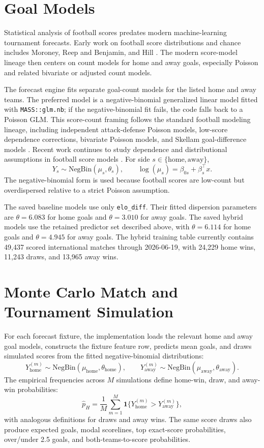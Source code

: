 \documentclass[11pt]{article}
\begin{document}
\section{Goal Models}

Statistical analysis of football scores predates modern machine-learning
tournament forecasts. Early work on football score distributions and chance
includes Moroney, Reep and Benjamin, and Hill
\cite{moroney1956,reepbenjamin1968,hill1974}. The modern score-model lineage
then centers on count models for home and away goals, especially Poisson and
related bivariate or adjusted count models.

The forecast engine fits separate goal-count models for the listed home and away
teams. The preferred model is a negative-binomial generalized linear model
fitted with \texttt{MASS::glm.nb}; if the negative-binomial fit fails, the code
falls back to a Poisson GLM. This score-count framing follows the standard
football modeling lineage, including independent attack-defense Poisson models,
low-score dependence corrections, bivariate Poisson models, and Skellam
goal-difference models
\cite{maher1982,lee1997,dixoncoles1997,karlisntzoufras2003,karlisntzoufras2009}.
Recent work continues to study dependence and distributional assumptions in
football score models \cite{petretta2021,michels2023}. For side
$s \in \{\mathrm{home}, \mathrm{away}\}$,
\[
Y_s \sim \mathrm{NegBin}(\mu_s, \theta_s), \qquad
\log(\mu_s) = \beta_{0s} + \beta_s^\top x.
\]
The negative-binomial form is used because football scores are low-count but
overdispersed relative to a strict Poisson assumption.

The saved baseline models use only \texttt{elo\_diff}. Their fitted dispersion
parameters are $\theta=6.083$ for home goals and $\theta=3.010$ for away goals.
The saved hybrid models use the retained predictor set described above, with
$\theta=6.114$ for home goals and $\theta=4.945$ for away goals. The hybrid
training table currently contains 49,437 scored international matches through
2026-06-19, with 24,229 home wins, 11,243 draws, and 13,965 away wins.

\section{Monte Carlo Match and Tournament Simulation}

For each forecast fixture, the implementation loads the relevant home and away
goal models, constructs the fixture feature row, predicts mean goals, and draws
simulated scores from the fitted negative-binomial distributions:
\[
Y_\mathrm{home}^{(m)} \sim \mathrm{NegBin}(\mu_\mathrm{home}, \theta_\mathrm{home}),
\qquad
Y_\mathrm{away}^{(m)} \sim \mathrm{NegBin}(\mu_\mathrm{away}, \theta_\mathrm{away}).
\]
The empirical frequencies across $M$ simulations define home-win, draw, and
away-win probabilities:
\[
\hat{p}_{H} = \frac{1}{M}\sum_{m=1}^{M} \mathbf{1}
\{Y_\mathrm{home}^{(m)} > Y_\mathrm{away}^{(m)}\},
\]
with analogous definitions for draws and away wins. The same score draws also
produce expected goals, modal scorelines, top exact-score probabilities,
over/under 2.5 goals, and both-teams-to-score probabilities.
\end{document}
